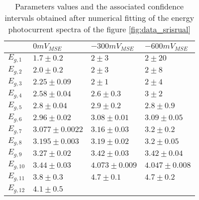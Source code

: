 \begin{table}[h]
\small
\centering
\begin{tabular}{ p{2cm}|p{4cm}p{4cm} p{4cm}}
\toprule
                & $0 mV_{MSE}$ & $-300 mV_{MSE}$ & $-600 mV_{MSE}$ \\
\midrule
$E_{g,1}$   & $1.7 \pm 0.2$ & $2 \pm 3$ & $2 \pm 20$ \\
$E_{g,2}$   & $2.0 \pm 0.2$ & $2 \pm 3$ & $2 \pm 8$ \\
$E_{g,3}$   & $2.25 \pm 0.09$ & $2 \pm 1$ & $2 \pm 4$ \\
$E_{g,4}$   & $2.58 \pm 0.04$ & $2.6 \pm 0.3$ & $3 \pm 2$ \\
$E_{g,5}$   & $2.8 \pm 0.04$ & $2.9 \pm 0.2$ & $2.8 \pm 0.9$ \\
$E_{g,6}$   & $2.96 \pm 0.02$ & $3.08 \pm 0.01$ & $3.09 \pm 0.05$ \\
$E_{g,7}$   & $3.077 \pm 0.0022$ & $3.16 \pm 0.03$ & $3.2 \pm 0.2$ \\
$E_{g,8}$   & $3.195 \pm 0.003$ & $3.19 \pm 0.02$ & $3.2 \pm 0.05$ \\
$E_{g,9}$   & $3.27 \pm 0.02$ & $3.42 \pm 0.03$ & $3.42 \pm 0.04$ \\
$E_{g,10}$   & $3.44 \pm 0.03$ & $4.073 \pm 0.009$ & $4.047 \pm 0.008$ \\
$E_{g,11}$   & $3.8 \pm 0.3$ & $4.7 \pm 0.1$ & $4.7 \pm 0.2$ \\
$E_{g,12}$   & $4.1 \pm 0.5$ &  &  \\
     
\bottomrule
\end{tabular}
\caption{Parameters values and the associated confidence intervals obtained 
    after numerical fitting of the energy photocurrent spectra of the figure \ref{fig:data_srisrual}}
\label{table:data_srisrual}
\end{table}
